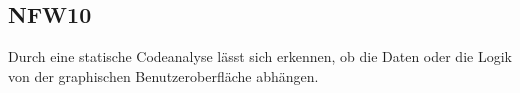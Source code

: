 \subsection*{NFW10}

Durch eine statische Codeanalyse lässt sich erkennen, ob die Daten oder die Logik von der graphischen Benutzeroberfläche abhängen.